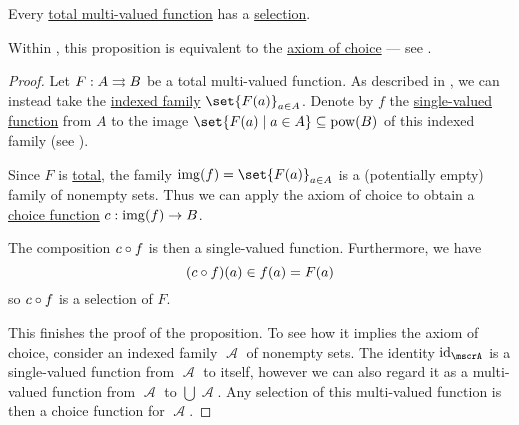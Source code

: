 \begin{proposition}\label{thm:existence_of_multi_valued_function_selection}
  Every \hyperref[def:multi_valued_function/total]{total multi-valued function} has a \hyperref[def:function/selection]{selection}.

  Within \hyperref[def:zfc]{}, this proposition is equivalent to the \hyperref[def:zfc/choice]{axiom of choice} --- see .
\end{proposition}
\begin{proof}
  Let \( F: A \rightrightarrows B \) be a total multi-valued function. As described in , we can instead take the \hyperref[def:indexed_family]{indexed family} \( \set{ F(a) }_{a \in A} \). Denote by \( f \) the \hyperref[def:function]{single-valued function} from \( A \) to the image \( \set{ F(a) \given a \in A } \subseteq \pow(B) \) of this indexed family (see ).

  Since \( F \) is \hyperref[def:multi_valued_function/total]{total}, the family \( \img(f) = \set{ F(a) }_{a \in A} \) is a (potentially empty) family of nonempty sets. Thus we can apply the axiom of choice to obtain a \hyperref[def:choice_function]{choice function} \( c: \operatorname{img}(f) \to B \).

  The composition \( c \mathbin \circ f \) is then a single-valued function. Furthermore, we have
  \begin{equation*}
    (c \mathbin \circ f)(a) \in f(a) = F(a)
  \end{equation*}
  so \( c \mathbin \circ f \) is a selection of \( F \).

  This finishes the proof of the proposition. To see how it implies the axiom of choice, consider an indexed family \( \mscrA \) of nonempty sets. The identity \( \id_\mscrA \) is a single-valued function from \( \mscrA \) to itself, however we can also regard it as a multi-valued function from \( \mscrA \) to \( \bigcup \mscrA \). Any selection of this multi-valued function is then a choice function for \( \mscrA \).
\end{proof}

